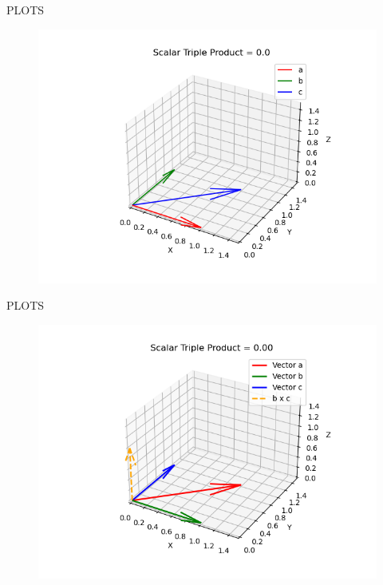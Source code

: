 \documentclass{beamer}
\begin{document}
\begin{frame}[fragile]{PLOTS}
\begin{figure}
    \centering
    \includegraphics[width=0.9\columnwidth]{figs/fig41.png}
    \caption{}
    \label{fig:placeholder}
\end{figure}
\end{frame}
\begin{frame}[fragile]{PLOTS}
\begin{figure}
    \centering
    \includegraphics[width=0.9\columnwidth]{figs/fig42.png}
    \caption{}
    \label{fig:placeholder}
\end{figure}
\end{frame}
\end{document}
